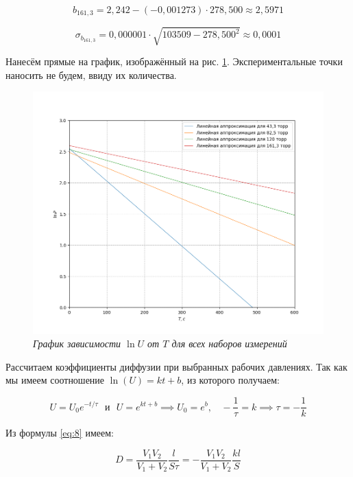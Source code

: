 \documentclass[a4paper,12pt]{article}
\begin{document}
\begin{equation*}
    b_{161,3} = 2,242 - (-0,001273) \cdot 278,500 \approx 2,5971
\end{equation*}

\begin{equation*}
    \sigma_{b_{161,3}} = 0,000001 \cdot \sqrt{103509 - {278,500}^2} \approx 0,0001
\end{equation*}

Нанесём прямые на график, изображённый на рис. \ref{graph:1}. Экспериментальные точки наносить не будем, ввиду их количества.

\begin{figure}[h!]
        \centering
	\includegraphics[width=1\textwidth]{graph_1.png}
	\caption{\textit{График зависимости $\ln{U}$ от $T$ для всех наборов измерений}}
	\label{graph:1}
\end{figure}

\newpage
Рассчитаем коэффициенты диффузии при выбранных рабочих давлениях. Так как мы имеем соотношение $\ln(U) = k t + b$, из которого получаем:

\begin{equation}
    U = U_0 e^{-t/\tau} \ \ \ \text{и} \ \ \ U = e^{kt + b} \implies U_0 = e^b, \ \ \ \ - \frac{1}{\tau} = k \implies \tau = - \frac{1}{k}
\end{equation}

Из формулы \eqref{eq:8} имеем:

\begin{equation}\label{eq:diffusion}
    D = \frac{V_1 V_2}{V_1 + V_2} \frac {l}{S \tau} = - \frac{V_1 V_2}{V_1 + V_2} \frac {kl}{S}
\end{equation}
\end{document}
